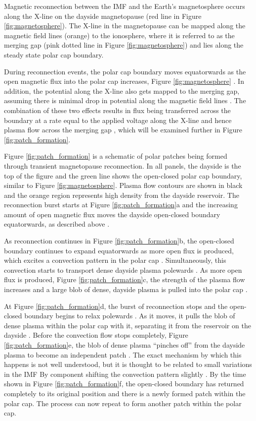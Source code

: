 Magnetic reconnection between the IMF and the Earth's magnetosphere occurs along the X-line on the dayside magnetopause (red line in Figure \ref{fig:magnetosphere}).  The X-line in the magnetopause can be mapped along the magnetic field lines (orange) to the ionosphere, where it is referred to as the merging gap (pink dotted line in Figure \ref{fig:magnetosphere}) and lies along the steady state polar cap boundary.  

During reconnection events, the polar cap boundary moves equatorwards as the open magnetic flux into the polar cap increases, Figure \ref{fig:magnetosphere} \citep{Cowley1991,Lockwood1992a}.  In addition, the potential along the X-line also gets mapped to the merging gap, assuming there is minimal drop in potential along the magnetic field lines \citep{Lockwood1992b}.  The combination of these two effects results in flux being transferred across the boundary at a rate equal to the applied voltage  along the X-line and hence plasma flow across the merging gap \citep{Lockwood1992b}, which will be examined further in Figure \ref{fig:patch_formation}.  

Figure \ref{fig:patch_formation} is a schematic of polar patches being formed through transient magnetopause reconnection.  In all panels, the dayside is the top of the figure and the green line shows the open-closed polar cap boundary, similar to Figure \ref{fig:magnetosphere}.  Plasma flow contours are shown in black and the orange region represents high density from the dayside reservoir.  The reconnection burst starts at Figure \ref{fig:patch_formation}a and the increasing amount of open magnetic flux moves the dayside open-closed boundary equatorwards, as described above \citep{Cowley1991}.

As reconnection continues in Figure \ref{fig:patch_formation}b, the open-closed boundary continues to expand equatorwards as more open flux is produced, which excites a convection pattern in the polar cap \citep{Cowley1991}.  Simultaneously, this convection starts to transport dense dayside plasma polewards \citep{Lockwood1992b}.  As more open flux is produced, Figure \ref{fig:patch_formation}c, the strength of the plasma flow increases and a large blob of dense, dayside plasma is pulled into the polar cap \citep{Lockwood1992b}.

At Figure \ref{fig:patch_formation}d, the burst of reconnection stops and the open-closed boundary begins to relax polewards \citep{Cowley1991}.  As it moves, it pulls the blob of dense plasma within the polar cap with it, separating it from the reservoir on the dayside \citep{Lockwood1992b}.  Before the convection flow stops completely, Figure \ref{fig:patch_formation}e, the blob of dense plasma ``pinches off'' from the dayside plasma to become an independent patch \citep{Lockwood1992b}.  The exact mechanism by which this happens is not well understood, but it is thought to be related to small variations in the IMF By component shifting the convection pattern slightly \citep{Cowley1980,Lockwood1992b}.  By the time shown in Figure \ref{fig:patch_formation}f, the open-closed boundary has returned completely to its original position and there is a newly formed patch within the polar cap.  The process can now repeat to form another patch within the polar cap.


